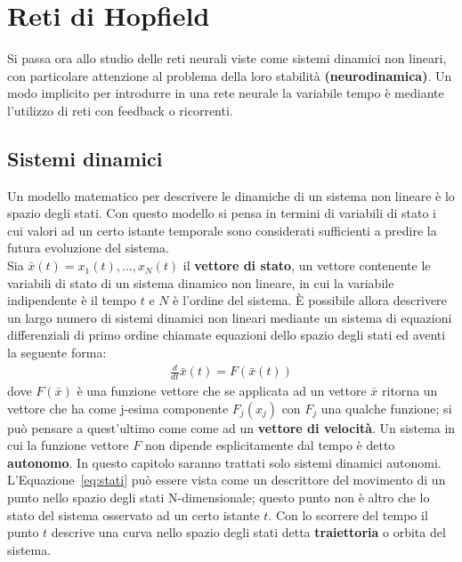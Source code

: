 
\chapter{Reti di Hopfield} %
\label{cha:reti_di_hopfield}
Si passa ora allo studio delle reti neurali viste come sistemi dinamici non lineari, con particolare attenzione al problema della loro stabilità \textbf{(neurodinamica)}. Un modo implicito per introdurre in una rete neurale la variabile tempo è mediante l’utilizzo di reti con feedback o ricorrenti.

\section{Sistemi dinamici} %
\label{sec:sistemi_dinamici}
Un modello matematico per descrivere le dinamiche di un sistema non lineare è lo spazio degli stati. Con questo modello si pensa in termini di variabili di stato i cui valori ad un certo istante temporale sono considerati sufficienti a predire la futura evoluzione del sistema.\\

Sia $\bar{x}(t) = x_1(t), \dots, x_N(t)$ il \textbf{vettore di stato}, un vettore contenente le variabili di stato di un sistema dinamico non lineare, in cui la variabile indipendente è il tempo $t$ e $N$ è l'ordine del sistema. È possibile allora descrivere un largo numero di sistemi dinamici non lineari mediante un sistema di equazioni differenziali di primo ordine chiamate equazioni dello spazio degli stati ed aventi la seguente forma:
\begin{align}
	\frac{d}{dt} \bar{x}(t) = F(\bar{x}(t))\label{eq:stati}
\end{align}
dove $F(\bar{x})$ è una funzione vettore che se applicata ad un vettore $\bar{x}$ ritorna un vettore che ha come j-esima componente $F_j(x_j)$ con $F_j$ una qualche funzione; si può pensare a quest'ultimo come come ad un \textbf{vettore di velocità}. Un sistema in cui la funzione vettore $F$ non dipende esplicitamente dal tempo è detto \textbf{autonomo}. In questo capitolo saranno trattati solo sistemi dinamici autonomi.\\

L'Equazione~\eqref{eq:stati} può essere vista come un descrittore del movimento di un punto nello spazio degli stati N-dimensionale; questo punto non è altro che lo stato del sistema osservato ad un certo istante $t$. Con lo scorrere del tempo il punto $t$ descrive una curva nello spazio degli stati detta \textbf{traiettoria} o orbita del sistema.

